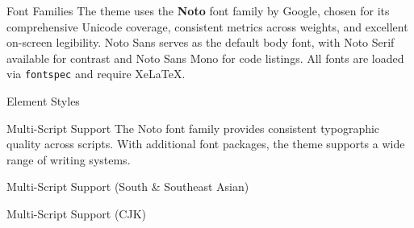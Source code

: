 
\begin{frame}{Font Families}
    The theme uses the \textbf{Noto} font family by Google, chosen for its
    comprehensive Unicode coverage, consistent metrics across weights, and
    excellent on-screen legibility. Noto Sans serves as the default body font,
    with Noto Serif available for contrast and Noto Sans Mono for code listings.
    All fonts are loaded via \texttt{fontspec} and require XeLaTeX.

    
\end{frame}


\begin{frame}{Element Styles}
    
\end{frame}


\begin{frame}{Multi-Script Support}
    The Noto font family provides consistent typographic quality across scripts.
    With additional font packages, the theme supports a wide range of writing systems.

    
\end{frame}

\begin{frame}{Multi-Script Support (South \& Southeast Asian)}
    
\end{frame}

\begin{frame}{Multi-Script Support (CJK)}
    
\end{frame}
